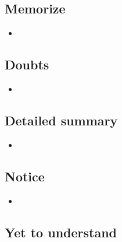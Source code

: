 \documentclass{article}
\begin{document}
\subsection{Memorize}

    \begin{itemize}

    \item 
    
    \end{itemize}

\subsection{Doubts}

    \begin{itemize}

    \item 
    
    \end{itemize}

\subsection{Detailed summary}

    \begin{itemize}

    \item 
    
    \end{itemize}

\subsection{Notice}

    \begin{itemize}

    \item 
    
    \end{itemize}

\subsection{Yet to understand}
\end{document}
